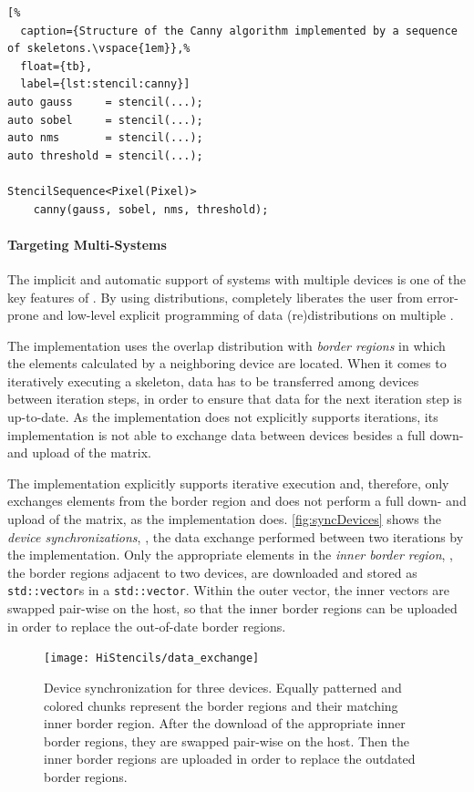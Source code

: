 \begin{lstlisting}[%
  caption={Structure of the Canny algorithm implemented by a sequence of skeletons.\vspace{1em}},%
  float={tb},
  label={lst:stencil:canny}]
auto gauss     = stencil(...);
auto sobel     = stencil(...);
auto nms       = stencil(...);
auto threshold = stencil(...);

StencilSequence<Pixel(Pixel)>
    canny(gauss, sobel, nms, threshold);
\end{lstlisting}

\paragraph{Targeting Multi-\GPU Systems}
The implicit and automatic support of systems with multiple \OpenCL devices is one of the key features of \SkelCL.
By using distributions, \SkelCL completely liberates the user from error-prone and low-level explicit programming of data (re)distributions on multiple \GPUs.

The  implementation uses the overlap distribution with \textit{border regions} in which the elements calculated by a neighboring device are located.
When it comes to iteratively executing a skeleton, data has to be transferred among devices between iteration steps, in order to ensure that data for the next iteration step is up-to-date.
As the  implementation does not explicitly supports iterations, its implementation is not able to exchange data between devices besides a full down- and upload of the matrix.

The  implementation explicitly supports iterative execution and, therefore, only exchanges elements from the border region and does not perform a full down- and upload of the matrix, as the  implementation does.
\autoref{fig:syncDevices} shows the \textit{device synchronizations}, \ie, the data exchange performed between two iterations by the  implementation.
Only the appropriate elements in the \emph{inner border region}, \ie, the border regions adjacent to two \OpenCL devices, are downloaded and stored as \texttt{std::vector}s in a \texttt{std::vector}.
Within the outer vector, the inner vectors are swapped pair-wise on the host, so that the inner border regions can be uploaded in order to replace the out-of-date border regions.

\begin{figure}[tb]
  \centering
  \texttt{[image: HiStencils/data\_exchange]}
  \caption[Device synchronization for three devices during the execution of the \stencil skeleton.]
          {\small Device synchronization for three devices. Equally patterned and colored chunks represent the border regions and their matching inner border region. After the download of the appropriate inner border regions, they are swapped pair-wise on the host. Then the inner border regions are uploaded in order to replace the outdated border regions.}
  \label{fig:syncDevices}
  \vspace{1em}
\end{figure}


